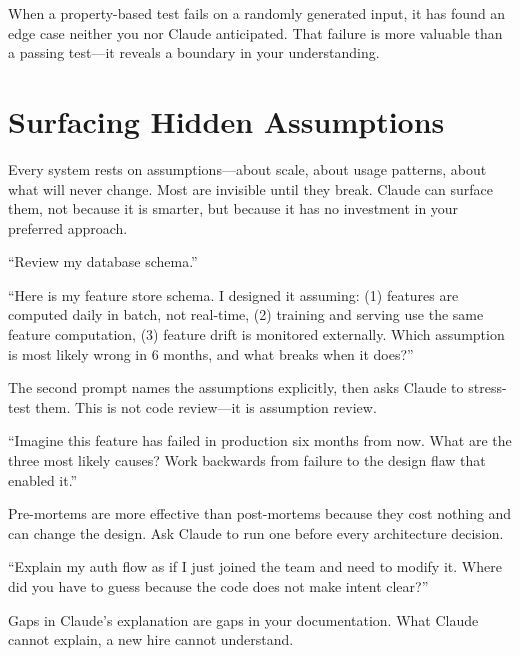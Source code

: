 When a property-based test fails on a randomly generated input, it has found
an edge case neither you nor Claude anticipated. That failure is more
valuable than a passing test---it reveals a boundary in your understanding.


\section{Surfacing Hidden Assumptions}
\label{sec:hidden-assumptions}

Every system rests on assumptions---about scale, about usage patterns,
about what will never change. Most are invisible until they break.
Claude can surface them, not because it is smarter, but because it has
no investment in your preferred approach.

\begin{beforeafter}
\before
``Review my database schema.''

\after
``Here is my feature store schema. I designed it assuming:
(1) features are computed daily in batch, not real-time,
(2) training and serving use the same feature computation,
(3) feature drift is monitored externally.
Which assumption is most likely wrong in 6 months,
and what breaks when it does?''
\end{beforeafter}

The second prompt names the assumptions explicitly, then asks Claude
to stress-test them. This is not code review---it is assumption review.

\begin{tipbox}
``Imagine this feature has failed in production six months from now.
What are the three most likely causes?
Work backwards from failure to the design flaw that enabled it.''

Pre-mortems are more effective than post-mortems because they cost nothing
and can change the design. Ask Claude to run one before every
architecture decision.
\end{tipbox}

\begin{tipbox}
``Explain my auth flow as if I just joined the team and need to modify it.
Where did you have to guess because the code does not make intent clear?''

Gaps in Claude's explanation are gaps in your documentation.
What Claude cannot explain, a new hire cannot understand.
\end{tipbox}

